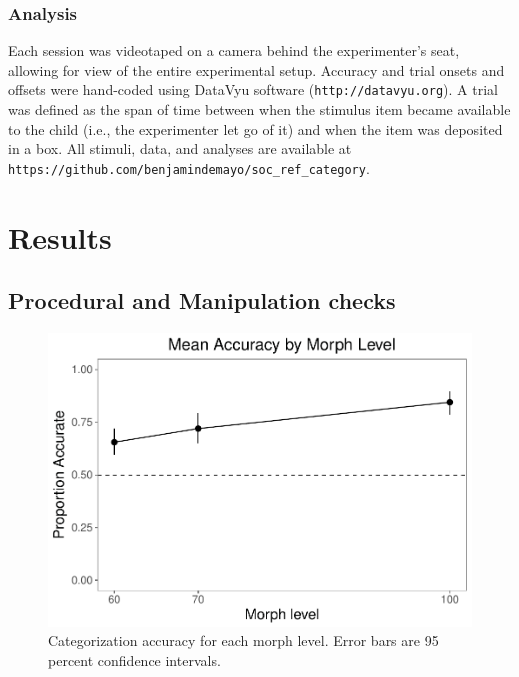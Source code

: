 \documentclass[man]{apa6}
\theoremstyle{definition}
\theoremstyle{definition}
\theoremstyle{definition}
\theoremstyle{remark}
\begin{document}
\subsubsection{Analysis}\label{analysis}

Each session was videotaped on a camera behind the experimenter's seat,
allowing for view of the entire experimental setup. Accuracy and trial
onsets and offsets were hand-coded using DataVyu software
(\texttt{http://datavyu.org}). A trial was defined as the span of time
between when the stimulus item became available to the child (i.e., the
experimenter let go of it) and when the item was deposited in a box. All
stimuli, data, and analyses are available at
\texttt{https://github.com/benjamindemayo/soc\_ref\_category}.

\section{Results}\label{results}

\subsection{Procedural and Manipulation
checks}\label{procedural-and-manipulation-checks}

\begin{figure}
\centering
\includegraphics{soc_ref_category_paper_files/figure-latex/unnamed-chunk-6-1.pdf}
\caption{\label{fig:unnamed-chunk-6}Categorization accuracy for each morph
level. Error bars are 95 percent confidence intervals.}
\end{figure}
\end{document}
